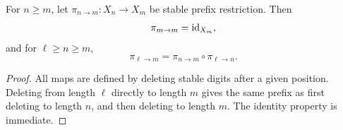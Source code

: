\begin{proposition}
\label{prop:stable-restrictions-inverse-system}
For \(n\ge m\), let \(\pi_{n\to m}:X_n\to X_m\) be stable prefix restriction.  Then
\[
\pi_{m\to m}=\operatorname{id}_{X_m},
\]
and for \(\ell\ge n\ge m\),
\[
\pi_{\ell\to m}=\pi_{n\to m}\circ\pi_{\ell\to n}.
\]
\end{proposition}

\begin{proof}
All maps are defined by deleting stable digits after a given position.  Deleting from length \(\ell\) directly to length \(m\) gives the same prefix as first deleting to length \(n\), and then deleting to length \(m\).  The identity property is immediate.
\end{proof}

